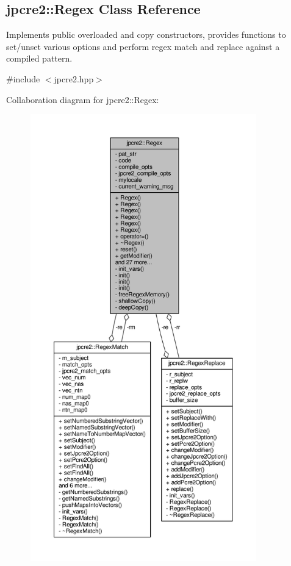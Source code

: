 \hypertarget{classjpcre2_1_1Regex}{}\subsection{jpcre2\+:\+:Regex Class Reference}
\label{classjpcre2_1_1Regex}


Implements public overloaded and copy constructors, provides functions to set/unset various options and perform regex match and replace against a compiled pattern.  




{\ttfamily \#include $<$jpcre2.\+hpp$>$}



Collaboration diagram for jpcre2\+:\+:Regex\+:\nopagebreak
\begin{figure}[H]
\begin{center}
\leavevmode
\includegraphics[height=550pt]{classjpcre2_1_1Regex__coll__graph}
\end{center}
\end{figure}
